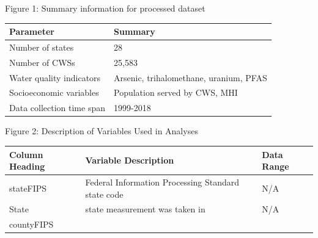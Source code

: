 \documentclass[12pt,]{article}
\begin{document}
Figure 1: Summary information for processed dataset

\begin{longtable}[]{@{}ll@{}}
\toprule
\textbf{Parameter} & \textbf{Summary}\tabularnewline
\midrule
\endhead
Number of states & 28\tabularnewline
Number of CWSs & 25,583\tabularnewline
Water quality indicators & Arsenic, trihalomethane, uranium,
PFAS\tabularnewline
Socioeconomic variables & Population served by CWS, MHI\tabularnewline
Data collection time span & 1999-2018\tabularnewline
\bottomrule
\end{longtable}

Figure 2: Description of Variables Used in Analyses

\begin{longtable}[]{@{}lll@{}}
\toprule
\begin{minipage}[b]{0.22\columnwidth}\raggedright
\textbf{Column Heading}\strut
\end{minipage} & \begin{minipage}[b]{0.46\columnwidth}\raggedright
\textbf{Variable Description}\strut
\end{minipage} & \begin{minipage}[b]{0.23\columnwidth}\raggedright
\textbf{Data Range}\strut
\end{minipage}\tabularnewline
\midrule
\endhead
\begin{minipage}[t]{0.22\columnwidth}\raggedright
stateFIPS\strut
\end{minipage} & \begin{minipage}[t]{0.46\columnwidth}\raggedright
Federal Information Processing Standard state code\strut
\end{minipage} & \begin{minipage}[t]{0.23\columnwidth}\raggedright
N/A\strut
\end{minipage}\tabularnewline
\begin{minipage}[t]{0.22\columnwidth}\raggedright
State\strut
\end{minipage} & \begin{minipage}[t]{0.46\columnwidth}\raggedright
state measurement was taken in\strut
\end{minipage} & \begin{minipage}[t]{0.23\columnwidth}\raggedright
N/A\strut
\end{minipage}\tabularnewline
\begin{minipage}[t]{0.22\columnwidth}\raggedright
countyFIPS\strut
\end{minipage} & \begin{minipage}[t]{0.46\columnwidth}\raggedright

\end{minipage}
\end{longtable}
\end{document}
